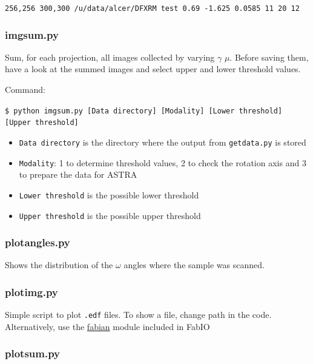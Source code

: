 \documentclass[11pt]{scrartcl}
\begin{document}
{\texttt{256,256 300,300 /u/data/alcer/DFXRM test 0.69 -1.625 0.0585 11 20 12}}

\subsubsection{img\textunderscore sum.py}

Sum, for each projection, all images collected by varying $\gamma$ $\mu$. Before saving them, have a look at the summed images and select upper and lower threshold values.

Command: 

{\texttt{\$ python img\textunderscore sum.py [Data directory] [Modality] [Lower threshold] [Upper threshold]}}

\begin{itemize}
    \item {\texttt{Data directory}} is the directory where the output from {\texttt{getdata.py}} is stored
    \item {\texttt{Modality}}: 1 to determine threshold values, 2 to check the rotation axis and 3 to prepare the data for {\footnotesize{ASTRA}}
    \item {\texttt{Lower threshold}} is the possible lower threshold
    \item {\texttt{Upper threshold}} is the possible upper threshold
    
\end{itemize}

\subsubsection{plot\textunderscore angles.py}

Shows the distribution of the $\omega$ angles where the sample was scanned. 

\subsubsection{plot\textunderscore img.py}

Simple script to plot {\texttt{.edf}} files. To show a file, change path in the code. Alternatively, use the \href{https://sourceforge.net/p/fable/wiki/fabian/}{fabian} module included in FabIO \cite{knudsen2013fabio}

\subsubsection{plot\textunderscore sum.py}
\end{document}
